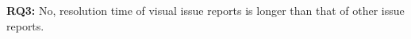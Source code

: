 


\summarybox
{{\bf RQ3: }{No, resolution time of visual issue reports is longer than that of other issue reports.
}}





